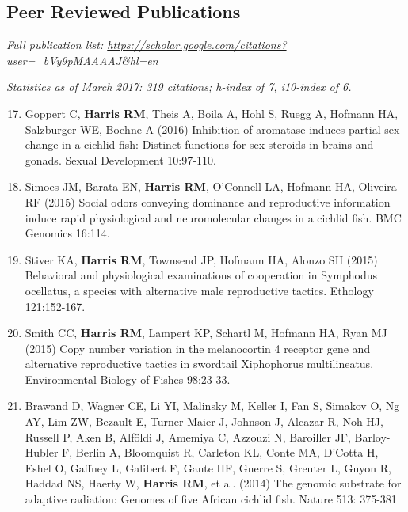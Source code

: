 \documentclass[margin,line]{resume}
\newenvironment{benumerate}[1]{
    \let\oldItem\item
    \def\item{\addtocounter{enumi}{-2}\oldItem}
    \begin{enumerate}
    \setcounter{enumi}{#1}
    \addtocounter{enumi}{1}
}{
    \end{enumerate}
}
\begin{document}
\begin{resume}

    \section{\mysidestyle Peer Reviewed Publications}

\begin{description}[leftmargin=0pt]  
\setlength{\itemsep}{4pt} 
\item[] {\em Full publication list: \url{https://scholar.google.com/citations?user=_bVy9pMAAAAJ&hl=en}}
\item[] {\em Statistics as of March 2017: 319 citations; h-index of 7, i10-index of 6.}
\item[]
\end{description}

    
\begin{benumerate}{16}
\setlength{\itemsep}{3pt}
\item Goppert C, {\bf Harris RM}, Theis A, Boila A, Hohl S, Ruegg A, Hofmann HA, Salzburger WE, Boehne A (2016)  Inhibition of aromatase induces partial sex change in a cichlid fish: Distinct functions for sex steroids in brains and gonads. Sexual Development 10:97-110.

\item Simoes JM, Barata EN, {\bf Harris RM}, O'Connell LA, Hofmann HA, Oliveira RF (2015) Social odors conveying dominance and reproductive information induce rapid physiological and neuromolecular changes in a cichlid fish. BMC Genomics 16:114. 

\item Stiver KA, {\bf Harris RM}, Townsend JP, Hofmann HA, Alonzo SH (2015) Behavioral and physiological examinations of cooperation in Symphodus ocellatus, a species with alternative male reproductive tactics. Ethology 121:152-167.

\item Smith CC, {\bf Harris RM}, Lampert KP, Schartl M, Hofmann HA, Ryan MJ (2015) Copy number variation in the melanocortin 4 receptor gene and alternative reproductive tactics in swordtail Xiphophorus multilineatus. Environmental Biology of Fishes 98:23-33.

\item Brawand D, Wagner CE, Li YI, Malinsky M, Keller I, Fan S, Simakov O, Ng AY, Lim ZW, Bezault E, Turner-Maier J, Johnson J, Alcazar R, Noh HJ, Russell P, Aken B, Alföldi J, Amemiya C, Azzouzi N, Baroiller JF, Barloy-Hubler F, Berlin A, Bloomquist R, Carleton KL, Conte MA, D'Cotta H, Eshel O, Gaffney L, Galibert F, Gante HF, Gnerre S, Greuter L, Guyon R, Haddad NS, Haerty W, {\bf Harris RM}, et al. (2014) The genomic substrate for adaptive radiation: Genomes of five African cichlid fish. Nature 513: 375-381


\end{benumerate}
\end{resume}
\end{document}
